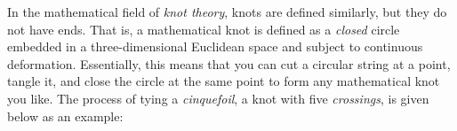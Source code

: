 \vspace{4mm}
\begin{center}
\end{center}
\vspace{1mm}

In the mathematical field of \textit{knot theory}, knots are defined similarly, but they do not have ends. That is, a mathematical knot is defined as a \textit{closed} circle embedded in a three-dimensional Euclidean space and subject to continuous deformation. Essentially, this means that you can cut a circular string at a point, tangle it, and close the circle at the same point to form any mathematical knot you like. The process of tying a \textit{cinquefoil}, a knot with five \textit{crossings}, is given below as an example:

